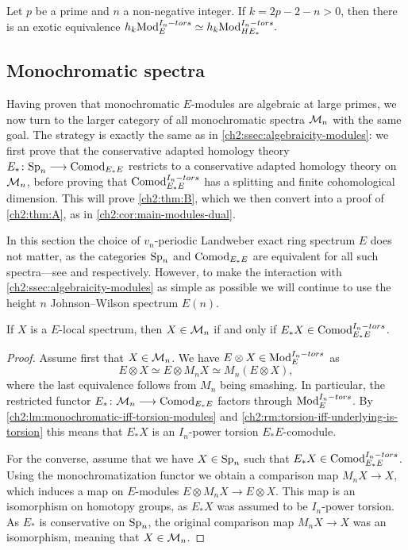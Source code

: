 \begin{corollary}
    Let $p$ be a prime and $n$ a non-negative integer. If $k=2p-2-n>0$, then there is an exotic equivalence $h_k \mathrm{Mod}_{E}^{I_n-tors} \simeq h_k \mathrm{Mod}_{HE_*}^{I_n-tors}.$
\end{corollary}



\subsection{Monochromatic spectra}
\label{ch2:ssec:algebraicity-spectra}

Having proven that monochromatic $E$-modules are algebraic at large primes, we now turn to the larger category of all monochromatic spectra $\mathcal{M}_{n}$ with the same goal. The strategy is exactly the same as in \cref{ch2:ssec:algebraicity-modules}: we first prove that the conservative adapted homology theory $E_*\colon \mathrm{Sp}_{n}\longrightarrow \mathrm{Comod}_{E_*E}$ restricts to a conservative adapted homology theory on $\mathcal{M}_{n}$, before proving that $\mathrm{Comod}_{E_*E}^{I_n-tors}$ has a splitting and finite cohomological dimension. This will prove \cref{ch2:thm:B}, which we then convert into a proof of \cref{ch2:thm:A}, as in \cref{ch2:cor:main-modules-dual}. 

In this section the choice of $v_n$-periodic Landweber exact ring spectrum $E$ does not matter, as the categories $\mathrm{Sp}_{n}$ and $\mathrm{Comod}_{E_*E}$ are equivalent for all such spectra---see \cite[1.12]{hovey_95} and \cite[4.2]{hovey-strickland_2005a} respectively. However, to make the interaction with \cref{ch2:ssec:algebraicity-modules} as simple as possible we will continue to use the height $n$ Johnson--Wilson spectrum $E(n)$.

\begin{lemma}
    \label{ch2:lm:monochromatic-iff-torsion-comodules}
    If $X$ is a $E$-local spectrum, then $X\in \mathcal{M}_{n}$ if and only if $E_*X\in \mathrm{Comod}_{E_*E}^{I_n-tors}$. 
\end{lemma}
\begin{proof}
    Assume first that $X\in \mathcal{M}_{n}$. We have $E\otimes X\in \mathrm{Mod}_{E}^{I_n-tors}$ as
    $$E\otimes X\simeq E\otimes M_n X\simeq M_n (E\otimes X),$$
    where the last equivalence follows from $M_n$ being smashing. In particular, the restricted functor $E_*\colon \mathcal{M}_{n}\longrightarrow \mathrm{Comod}_{E_*E}$ factors through $\mathrm{Mod}_{E}^{I_n-tors}$. By \cref{ch2:lm:monochromatic-iff-torsion-modules} and \cref{ch2:rm:torsion-iff-underlying-is-torsion} this means that $E_*X$ is an $I_n$-power torsion $E_*E$-comodule. 

    For the converse, assume that we have $X\in \mathrm{Sp}_{n}$ such that $E_*X\in \mathrm{Comod}_{E_*E}^{I_n-tors}$. Using the monochromatization functor we obtain a comparison map $M_n X\longrightarrow X$, which induces a map on $E$-modules $E\otimes M_n X\longrightarrow E\otimes X$. This map is an isomorphism on homotopy groups, as $E_*X$ was assumed to be $I_n$-power torsion. As $E_*$ is conservative on $\mathrm{Sp}_{n}$, the original comparison map $M_n X\longrightarrow X$ was an isomorphism, meaning that $X\in \mathcal{M}_{n}$. 
\end{proof}


